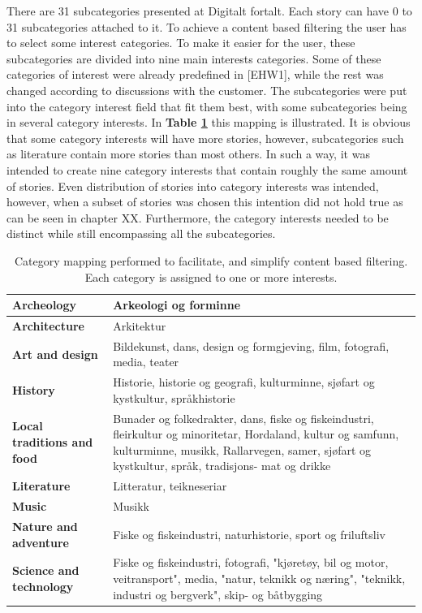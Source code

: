 There are 31 subcategories presented at Digitalt fortalt. Each story can have 0 to 31 subcategories attached to it. To achieve a content based filtering the user has to select some interest categories. To make it easier for the user, these subcategories are divided into nine main interests categories. Some of these categories of interest were already predefined in [EHW1], while the rest was changed according to discussions with the customer. The subcategories were put into the category interest field that fit them best, with some subcategories being in several category interests. In \textbf{Table \ref{Tab:categorymapping}} this mapping is illustrated. It is obvious that some category interests will have more stories, however, subcategories such as literature contain more stories than most others. In such a way, it was intended to create nine category interests that contain roughly the same amount of stories. Even distribution of stories into category interests was intended, however, when a subset of stories was chosen this intention did not hold true as can be seen in chapter XX. Furthermore, the category interests needed to be distinct while still encompassing all the subcategories. 

\begin{table}[!h]
	\begin{center}
		\begin{tabular}{ | p{5cm} | p{12cm}|}
			\hline
			\textbf{Archeology} & Arkeologi og forminne \\ \hline
			\textbf{Architecture} & Arkitektur \\ \hline
			\textbf{Art and design} & Bildekunst, dans, design og formgjeving, film, fotografi, media, teater \\ \hline
			\textbf{History} & Historie, historie og geografi, kulturminne, sjøfart og kystkultur, språkhistorie \\ \hline
			\textbf{Local traditions and food} & Bunader og folkedrakter, dans, fiske og fiskeindustri, fleirkultur og minoritetar, Hordaland, kultur og samfunn, kulturminne, musikk, Rallarvegen, samer, sjøfart og kystkultur, språk, tradisjons- mat og drikke \\ \hline
			\textbf{Literature } & Litteratur, teikneseriar \\ \hline
			\textbf{Music} & Musikk \\ \hline
			\textbf{Nature and adventure} & Fiske og fiskeindustri, naturhistorie, sport og friluftsliv \\ \hline
			\textbf{Science and technology} & Fiske og fiskeindustri, fotografi, "kjøretøy, bil og motor, veitransport", media, "natur, teknikk og næring", "teknikk, industri og bergverk", skip- og båtbygging \\ \hline
		\end{tabular}
	\end{center}
	\caption{Category mapping performed to facilitate, and simplify content based filtering. Each category is assigned to one or more interests.}
	\label{Tab:categorymapping}
\end{table}


